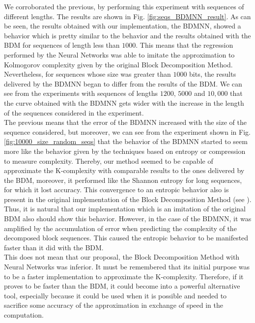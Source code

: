 We corroborated the previous, by performing this experiment with sequences of different lengths. The results are shown in Fig. \ref{fig:seqs_BDMNN_result}. As can be seen, the results obtained with our implementation, the BDMNN, showed a behavior which is pretty similar to the behavior and the results obtained with the BDM for sequences of length less than $1000$. This means that the regression performed by the Neural Networks was able to imitate the approximation to Kolmogorov complexity given by the original Block Decomposition Method. Nevertheless, for sequences whose size was greater than $1000$ bits, the results delivered by the BDMNN began to differ from the results of the BDM. We can see from the experiments with sequences of lengths $1200$, $5000$ and $10,000$ that the curve obtained with the BDMNN gets wider with the increase in the length of the sequences considered in the experiment.\\

The previous means that the error of the BDMNN increased with the size of the sequence considered, but moreover, we can see from the experiment shown in Fig. \ref{fig:10000_size_random_seqs} that the behavior of the BDMNN started to seem more like the behavior given by the techniques based on entropy or compression to measure complexity. Thereby, our method seemed to be capable of approximate the K-complexity with comparable results to the ones delivered by the BDM, moreover, it performed like the Shannon entropy for long sequences, for which it lost accuracy. This convergence to an entropic behavior also is present in the original implementation of the Block Decomposition Method (see \cite{decomposition}). Thus, it is natural that our implementation which is an imitation of the original BDM also should show this behavior. However, in the case of the BDMNN, it was amplified by the accumulation of error when predicting the complexity of the decomposed block sequences. This caused the entropic behavior to be manifested faster than it did with the BDM.\\

This does not mean that our proposal, the Block Decomposition Method with Neural Networks was inferior. It must be remembered that its initial purpose was to be a faster implementation to approximate the K-complexity. Therefore, if it proves to be faster than the BDM, it could become into a powerful alternative tool, especially because it could be used when it is possible and needed to sacrifice some accuracy of the approximation in exchange of speed in the computation.

